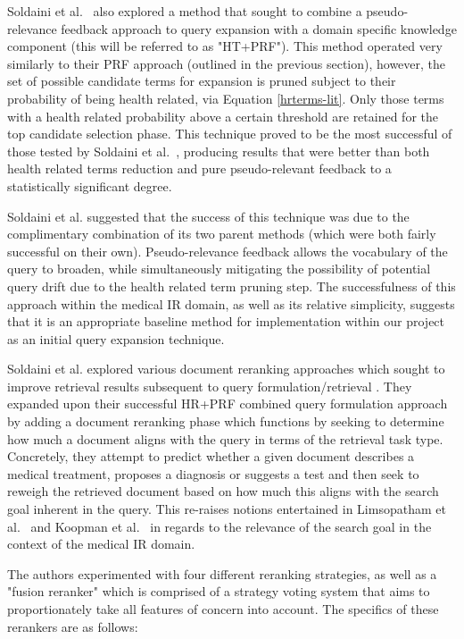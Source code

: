 \documentclass[a4paper]{report}
\begin{document}
Soldaini et al.~\cite{Soldaini2015RetrievingML} also explored a method that sought to combine a pseudo-relevance feedback approach to query expansion with a domain specific knowledge component (this will be referred to as "HT+PRF"). This method operated very similarly to their PRF approach (outlined in the previous section), however, the set of possible candidate terms for expansion is pruned subject to their probability of being health related, via Equation \ref{hrterms-lit}. Only those terms with a health related probability above a certain threshold are retained for the top candidate selection phase. This technique proved to be the most successful of those tested by Soldaini et al.~\cite{Soldaini2015RetrievingML}, producing results that were better than both health related terms reduction and pure pseudo-relevant feedback to a statistically significant degree.

Soldaini et al. suggested that the success of this technique was due to the complimentary combination of its two parent methods (which were both fairly successful on their own). Pseudo-relevance feedback allows the vocabulary of the query to broaden, while simultaneously mitigating the possibility of potential query drift due to the health related term pruning step. The successfulness of this approach within the medical IR domain, as well as its relative simplicity, suggests that it is an appropriate baseline method for implementation within our project as an initial query expansion technique. 


Soldaini et al. explored various document reranking approaches which sought to improve retrieval results subsequent to query formulation/retrieval \cite{SoldainiPlaceholder}. They expanded upon their successful HR+PRF combined query formulation approach by adding a document reranking phase which functions by seeking to determine how much a document aligns with the query in terms of the retrieval task type. Concretely, they attempt to predict whether a given document describes a medical treatment, proposes a diagnosis or suggests a test and then seek to reweigh the retrieved document based on how much this aligns with the search goal inherent in the query. This re-raises notions entertained in Limsopatham et al.~\citep{Limsopatham2013A-Task-Specific} and Koopman et al.~\citep{koopman2017generating} in regards to the relevance of the search goal in the context of the medical IR domain. 

The authors experimented with four different reranking strategies, as well as a "fusion reranker" which is comprised of a strategy voting system that aims to proportionately take all features of concern into account. The specifics of these rerankers are as follows:
\end{document}
